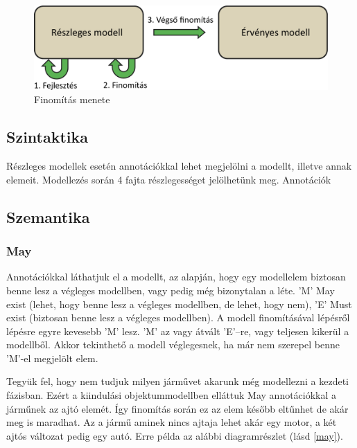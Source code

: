\begin{figure}[!ht]
	\centering
	\includegraphics[width=130mm]{figures/finom.pdf}
	\caption{Finomítás menete} 
	\label{finomit}
\end{figure}

\subsection{Szintaktika}
Részleges modellek esetén annotációkkal lehet megjelölni a modellt, illetve annak elemeit. Modellezés során 4 fajta részlegességet jelölhetünk meg. 
Annotációk

\subsection{Szemantika}
\subsubsection{May}
Annotációkkal láthatjuk el a modellt, az alapján, hogy egy modellelem biztosan benne lesz a végleges modellben, vagy pedig még bizonytalan a léte. \textsf{’M’} May exist (lehet, hogy benne lesz a végleges modellben, de lehet, hogy nem), \textsf{’E’} Must exist (biztosan benne lesz a végleges modellben). A modell finomításával lépésről lépésre egyre kevesebb ’M’ lesz.  \textsf{’M’} az vagy átvált \textsf{’E’}–re, vagy teljesen kikerül a modellből. Akkor tekinthető a modell véglegesnek, ha már nem szerepel benne \textsf{’M’}-el megjelölt elem.
\par
Tegyük fel, hogy nem tudjuk milyen járművet akarunk még modellezni a kezdeti fázisban. Ezért a kiindulási objektummodellben elláttuk May annotációkkal a járműnek az ajtó elemét. Így finomítás során ez az elem később eltűnhet de akár meg is maradhat. Az a jármű aminek nincs ajtaja lehet akár egy motor, a két ajtós változat pedig egy autó. Erre példa az alábbi diagramrészlet (lásd \autoref{may}).

